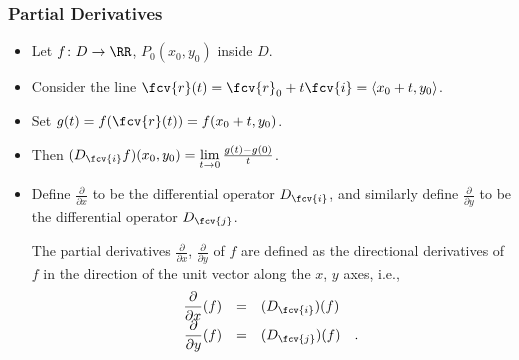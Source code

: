 \begin{frame}
\frametitle{Partial Derivatives}
\begin{itemize} 
\item Let $f\colon D \to \RR$,  $P_0(x_0,y_0)$ inside $D$.
\item<2-> Consider the line $\fcv{r}(t) = \fcv{r}_0 + t\fcv {i} = \langle x_0+t, y_0 \rangle$.
\item<3-> Set $g(t) = f(\fcv{r}(t)) = f(x_0+t, y_0)$.
\item<4-> Then $(D_{\fcv{i}} f)(x_0,y_0) = \lim\limits_{t\to 0} \frac{g(t)-g(0)}{t}$.
\item<5-> Define $ \frac{\partial}{\partial x}$ to be the differential operator $ D_{\fcv{i}}$, and similarly define $ \frac{\partial}{\partial y}$ to be the differential operator $ D_{\fcv{j}}$.

\begin{definition}
The partial derivatives $\frac{\partial}{\partial x} $, $\frac{\partial}{\partial y} $  of $f$ are defined as the directional derivatives of $f$ in the direction of the unit vector along the $x$, $y$ axes, i.e., 
\[
\begin{array}{rcl}
\displaystyle\frac{\partial}{\partial x}(f)&=&(D_{\fcv{i}})(f)\\
\displaystyle\frac{\partial}{\partial y}(f)&=&(D_{\fcv{j}})(f)\quad .
\end{array}
\]
\end{definition}
\end{itemize}
\end{frame}